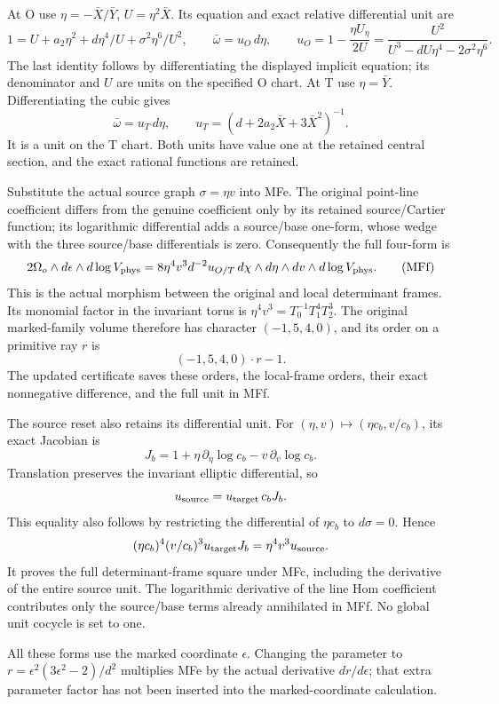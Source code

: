 At O use \(\eta=-\bar X/\bar Y\), \(U=\eta^2\bar X\).
Its equation and exact relative differential unit are
\[
 1=U+a_2\eta^2+d\eta^4/U+\sigma^2\eta^6/U^2,\qquad
 \bar\omega=u_O\,d\eta,\qquad
 u_O=1-\frac{\eta U_\eta}{2U}
     =\frac{U^2}{U^3-dU\eta^4-2\sigma^2\eta^6}.
\]
The last identity follows by differentiating the displayed implicit
equation; its denominator and \(U\) are units on the specified O chart.
At T use \(\eta=\bar Y\). Differentiating the cubic gives
\[
 \bar\omega=u_T\,d\eta,\qquad
 u_T=(d+2a_2\bar X+3\bar X^2)^{-1}.
\]
It is a unit on the T chart. Both units have value one at the retained
central section, and the exact rational functions are retained.

Substitute the actual source graph \(\sigma=\eta v\) into MFe. The
original point-line coefficient differs from the genuine coefficient
only by its retained source/Cartier function; its logarithmic
differential adds a source/base one-form, whose wedge with the three
source/base differentials is zero. Consequently the full four-form is
\[
 2\Omega_o\wedge d\epsilon\wedge d\log V_{\rm phys}
 =8\eta^4v^3d^{-2}u_{O/T}\,
    d\chi\wedge d\eta\wedge dv\wedge d\log V_{\rm phys}.        \tag{MFf}
\]
This is the actual morphism between the original and local determinant
frames. Its monomial factor in the invariant torus is
\(\eta^4v^3=T_0^{-1}T_1^4T_2^3\). The original marked-family
volume therefore has character \((-1,5,4,0)\), and its order on a
primitive ray \(r\) is
\[
 (-1,5,4,0)\cdot r-1.
\]
The updated certificate saves these orders, the local-frame orders,
their exact nonnegative difference, and the full unit in MFf.

The source reset also retains its differential unit. For
\((\eta,v)\mapsto(\eta c_b,v/c_b)\), its exact Jacobian is
\[
 J_b=1+\eta\,\partial_\eta\log c_b
          -v\,\partial_v\log c_b .
\]
Translation preserves the invariant elliptic differential, so
\[
 u_{\rm source}=u_{\rm target}\,c_bJ_b.
\]
This equality also follows by restricting the differential of
\(\eta c_b\) to \(d\sigma=0\). Hence
\[
 (\eta c_b)^4(v/c_b)^3u_{\rm target}J_b
       =\eta^4v^3u_{\rm source}.
\]
It proves the full determinant-frame square under MFc, including the
derivative of the entire source unit. The logarithmic derivative of
the line Hom coefficient contributes only the source/base terms
already annihilated in MFf. No global unit cocycle is set to one.

All these forms use the marked coordinate \(\epsilon\). Changing the
parameter to \(r=\epsilon^2(3\epsilon^2-2)/d^2\) multiplies MFe by
the actual derivative \(dr/d\epsilon\); that extra parameter factor
has not been inserted into the marked-coordinate calculation.

